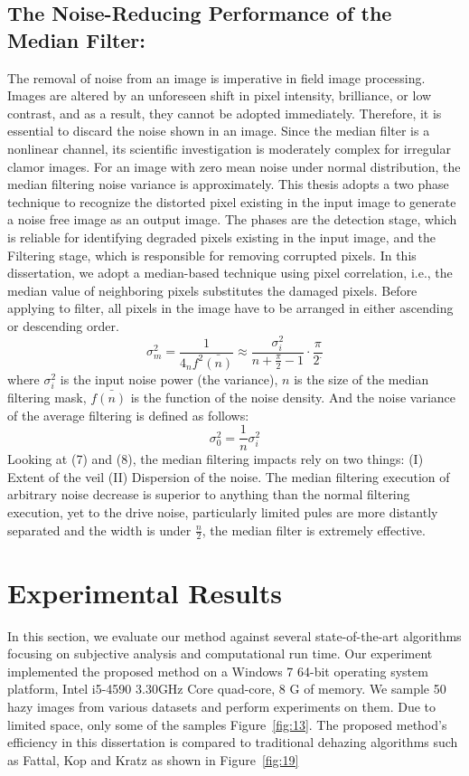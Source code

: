 \documentclass[doctor,english,listoffigures,listoftables]{thesis-uestc}
\begin{document}
\subsection{The Noise-Reducing Performance of the Median Filter:}
The removal of noise from an image is imperative in field image processing. Images are altered by an unforeseen shift in pixel intensity, brilliance, or low contrast, and as a result, they cannot be adopted immediately. Therefore, it is essential to discard the noise shown in an image. Since the median filter is a nonlinear channel, its scientific investigation is moderately complex for irregular clamor images. For an image with zero mean noise under normal distribution, the median filtering noise variance is approximately. This thesis adopts a two phase technique to recognize the distorted pixel existing in the input image to generate a noise free image as an output image. The phases are the detection stage, which is reliable for identifying degraded pixels existing in the input image, and the Filtering stage, which is responsible for removing corrupted pixels. In this dissertation, we adopt a median-based technique using pixel correlation, i.e., the median value of neighboring pixels substitutes the damaged pixels. Before applying to filter, all pixels in the image have to be arranged in either ascending or descending order.  
\begin {equation} 
\sigma^2_m = \frac{1}{4_n f^2 \bar{(n)}} \approx \frac{\sigma^2_i}{n+ \frac{\pi}{2}-1}\cdot\frac{\pi}{2^.} \end{equation} 
where $\sigma^2_i$ is the input  noise  power (the variance), $n$ is  the  size  of  the  median  filtering  mask, $ f \bar{(n)} $   is  the function of the noise density. And the noise variance of the average filtering is defined as follows:
\begin{equation} \sigma^2_0 = \frac{1}{n} \sigma^2_i \end{equation}
Looking at  (7) and (8), the median filtering impacts rely on two things: (I) Extent of the veil (II) Dispersion of the noise. The median filtering execution of arbitrary noise decrease is superior to anything than the normal filtering execution, yet to the drive noise, particularly limited pules are more distantly separated and the  width is under $\frac{n}{2}$, the median filter is extremely effective.

\section{Experimental Results}
In this section, we evaluate our method against several state-of-the-art algorithms focusing on subjective analysis and computational run time. Our experiment implemented the proposed method on a Windows 7 64-bit operating system platform, Intel i5-4590 3.30GHz Core quad-core, 8 G of memory. We sample 50 hazy images from various datasets and perform experiments on them. Due to limited space, only some of the samples Figure~\ref{fig:13}. The proposed method's efficiency in this dissertation is compared to traditional dehazing algorithms such as  Fattal, Kop and Kratz as shown in Figure~\ref{fig:19}  
\end{document}
